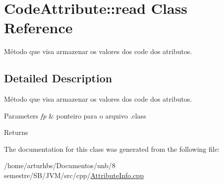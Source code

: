 \hypertarget{classCodeAttribute_1_1read}{}\section{Code\+Attribute\+:\+:read Class Reference}
\label{classCodeAttribute_1_1read}


Método que visa armazenar os valores dos code dos atributos.  




\subsection{Detailed Description}
Método que visa armazenar os valores dos code dos atributos. 


\begin{DoxyParams}{Parameters}
{\em fp} & ponteiro para o arquivo .class \\
\hline
\end{DoxyParams}
\begin{DoxyReturn}{Returns}

\end{DoxyReturn}


The documentation for this class was generated from the following file\+:\begin{DoxyCompactItemize}
\item 
/home/arturhbs/\+Documentos/unb/8 semestre/\+S\+B/\+J\+V\+M/src/cpp/\hyperlink{AttributeInfo_8cpp}{Attribute\+Info.\+cpp}\end{DoxyCompactItemize}
